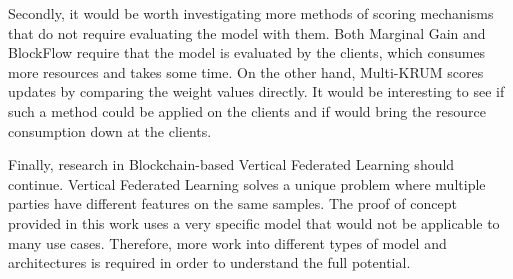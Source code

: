 Secondly, it would be worth investigating more methods of scoring mechanisms that do not require evaluating the model with them. Both Marginal Gain and BlockFlow require that the model is evaluated by the clients, which consumes more resources and takes some time. On the other hand, Multi-KRUM scores updates by comparing the weight values directly. It would be interesting to see if such a method could be applied on the clients and if would bring the resource consumption down at the clients.

Finally, research in Blockchain-based Vertical Federated Learning should continue. Vertical Federated Learning solves a unique problem where multiple parties have different features on the same samples. The proof of concept provided in this work uses a very specific model that would not be applicable to many use cases. Therefore, more work into different types of model and architectures is required in order to understand the full potential.
